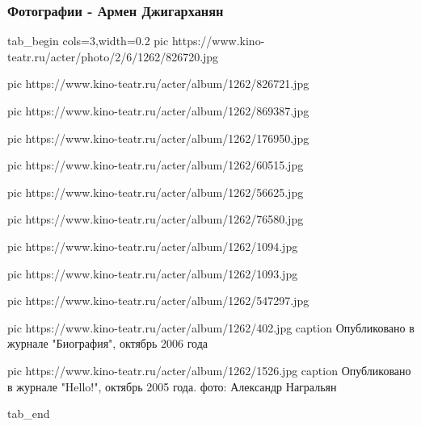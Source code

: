  
 
 

\subsubsection{Фотографии - Армен Джигарханян}

\ifcmt
tab_begin cols=3,width=0.2
	pic https://www.kino-teatr.ru/acter/photo/2/6/1262/826720.jpg
	
	pic https://www.kino-teatr.ru/acter/album/1262/826721.jpg
	
	pic https://www.kino-teatr.ru/acter/album/1262/869387.jpg
	
	pic https://www.kino-teatr.ru/acter/album/1262/176950.jpg
	
	pic https://www.kino-teatr.ru/acter/album/1262/60515.jpg
	
	pic https://www.kino-teatr.ru/acter/album/1262/56625.jpg
	
	pic https://www.kino-teatr.ru/acter/album/1262/76580.jpg
	
	pic https://www.kino-teatr.ru/acter/album/1262/1094.jpg
	
	pic https://www.kino-teatr.ru/acter/album/1262/1093.jpg
	
	pic https://www.kino-teatr.ru/acter/album/1262/547297.jpg

	pic https://www.kino-teatr.ru/acter/album/1262/402.jpg
	caption Опубликовано в журнале "Биография", октябрь 2006 года

	pic https://www.kino-teatr.ru/acter/album/1262/1526.jpg
	caption Опубликовано в журнале "Hello!", октябрь 2005 года. фото: Александр Награльян

tab_end
\fi

